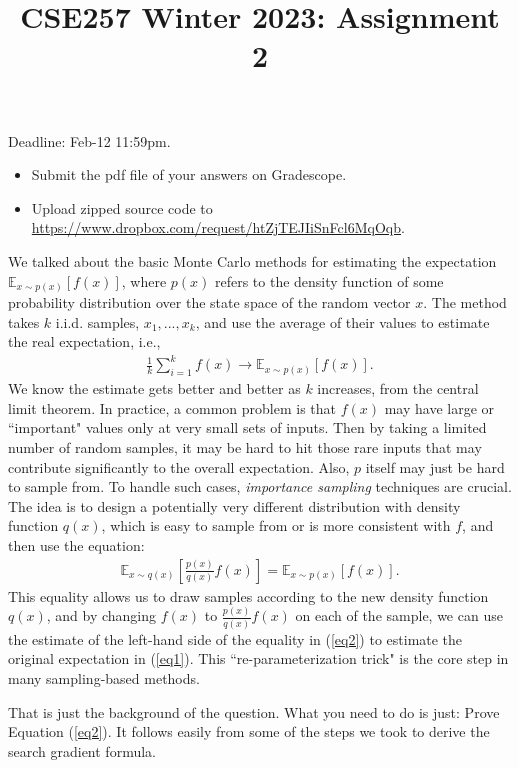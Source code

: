 \documentclass{article}
\title{CSE257 Winter 2023: Assignment 2}
\author{}
\date{}
\begin{document}
\maketitle
\linenumbers

Deadline: Feb-12 11:59pm. 
\begin{itemize}
    \item Submit the pdf file of your answers on Gradescope. 
    \item Upload zipped source code to \url{https://www.dropbox.com/request/htZjTEJIiSnFcl6MqOqb}. 
\end{itemize}

\begin{question}[1 Point]
We talked about the basic Monte Carlo methods for estimating the expectation $\mathbb{E}_{x\sim p(x)}[f(x)]$, where $p(x)$ refers to the density function of some probability distribution over the state space of the random vector $x$. The method takes $k$ i.i.d. samples, $x_1,...,x_k$, and use the average of their values to estimate the real expectation, i.e., 
\begin{eqnarray}\label{eq1}
\frac{1}{k}\sum_{i=1}^k f(x) \longrightarrow \mathbb{E}_{x\sim p(x)}[f(x)].
\end{eqnarray}
We know the estimate gets better and better as $k$ increases, from the central limit theorem. In practice, a common problem is that $f(x)$ may have large or ``important" values only at very small sets of inputs. Then by taking a limited number of random samples, it may be hard to hit those rare inputs that may contribute significantly to the overall expectation. Also, $p$ itself may just be hard to sample from. To handle such cases, {\em importance sampling} techniques are crucial. The idea is to design a potentially very different distribution with density function $q(x)$, which is easy to sample from or is more consistent with $f$, and then use the equation:
\begin{eqnarray}\label{eq2}
\mathbb{E}_{x\sim q(x)}[\frac{p(x)}{q(x)}f(x)]=\mathbb{E}_{x\sim p(x)}[f(x)].
\end{eqnarray}
This equality allows us to draw samples according to the new density function $q(x)$, and by changing $f(x)$ to $\frac{p(x)}{q(x)}f(x)$ on each of the sample, we can use the estimate of the left-hand side of the equality in (\ref{eq2}) to estimate the original expectation in (\ref{eq1}). This ``re-parameterization trick" is the core step in many sampling-based methods. 

That is just the background of the question. What you need to do is just: Prove Equation (\ref{eq2}). It follows easily from some of the steps we took to derive the search gradient formula. 
\end{question}
\end{document}
